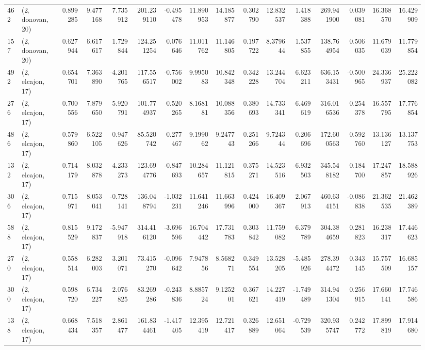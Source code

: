 \begin{tabular}{llrrrrrrrrrrrrrr}
462 &  (2, donovan, 20) &   0.899285 &   9.477168 &   7.735912 &   201.239110 &  -0.495478 &  11.890953 &  14.185877 &  0.302790 &  12.832537 &   1.418388 &   269.941900 &  0.039081 &  16.368570 &  16.429909 \\
157 &  (2, donovan, 20) &   0.627944 &   6.617617 &   1.729844 &   124.251254 &   0.076646 &  11.011762 &  11.146805 &  0.197722 &   8.379644 &   1.537855 &   138.764954 &  0.506035 &  11.679039 &  11.779854 \\
492 &  (2, elcajon, 17) &   0.654701 &   7.363890 &  -4.201765 &   117.556517 &  -0.756002 &   9.995083 &  10.842348 &  0.342228 &  13.244704 &   6.623211 &   636.153431 & -0.500965 &  24.336937 &  25.222082 \\
276 &  (2, elcajon, 17) &   0.700556 &   7.879650 &   5.920791 &   101.774937 &  -0.520265 &   8.168181 &  10.088356 &  0.380693 &  14.733341 &  -6.469619 &   316.016536 &  0.254378 &  16.557795 &  17.776854 \\
486 &  (2, elcajon, 17) &   0.579860 &   6.522105 &  -0.947626 &    85.520742 &  -0.277467 &   9.199062 &   9.247743 &  0.251266 &   9.724344 &   0.206696 &   172.600563 &  0.592760 &  13.136127 &  13.137753 \\
132 &  (2, elcajon, 17) &   0.714179 &   8.032878 &   4.233273 &   123.694776 &  -0.847693 &  10.284657 &  11.121815 &  0.375271 &  14.523516 &  -6.932503 &   345.548182 &  0.184700 &  17.247857 &  18.588926 \\
306 &  (2, elcajon, 17) &   0.715971 &   8.053041 &  -0.728141 &   136.048794 &  -1.032231 &  11.641246 &  11.663996 &  0.424000 &  16.409367 &   2.067913 &   460.634151 & -0.086838 &  21.362535 &  21.462389 \\
588 &  (2, elcajon, 17) &   0.815529 &   9.172837 &  -5.947918 &   314.416120 &  -3.696596 &  16.704442 &  17.731783 &  0.303842 &  11.759082 &   6.379789 &   304.384659 &  0.281823 &  16.238317 &  17.446623 \\
270 &  (2, elcajon, 17) &   0.558514 &   6.282003 &   3.201071 &    73.415270 &  -0.096642 &   7.947856 &   8.568271 &  0.349554 &  13.528205 &  -5.485926 &   278.394472 &  0.343145 &  15.757509 &  16.685157 \\
300 &  (2, elcajon, 17) &   0.598720 &   6.734227 &   2.076825 &    83.269286 &  -0.243836 &   8.885724 &   9.125201 &  0.367621 &  14.227419 &  -1.749489 &   314.941304 &  0.256915 &  17.660141 &  17.746586 \\
138 &  (2, elcajon, 17) &   0.668434 &   7.518357 &   2.861477 &   161.834461 &  -1.417405 &  12.395419 &  12.721417 &  0.326889 &  12.651064 &  -0.729539 &   320.935747 &  0.242772 &  17.899819 &  17.914680 \\

\end{tabular}
